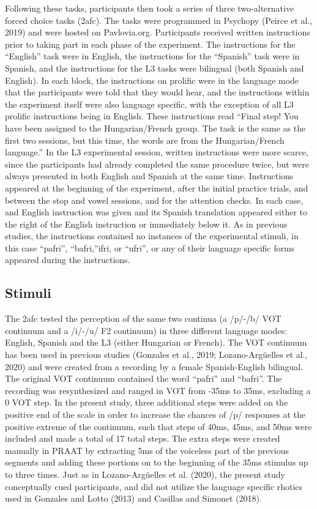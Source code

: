 \documentclass[
  man,floatsintext]{apa6}
\begin{document}
Following these tasks, participants then took a series of three two-alternative forced choice tasks (2afc).
The tasks were programmed in Psychopy (Peirce et al., 2019) and were hosted on Pavlovia.org.
Participants received written instructions prior to taking part in each phase of the experiment. The instructions for the ``English'' task were in English, the instructions for the ``Spanish'' task were in Spanish, and the instructions for the L3 tasks were bilingual (both Spanish and English). In each block, the instructions on prolific were in the language mode that the participants were told that they would hear, and the instructions within the experiment itself were also language specific, with the exception of all L3 prolific instructions being in English. These instructions read ``Final step! You have been assigned to the Hungarian/French group.
The task is the same as the first two sessions, but this time, the words are from the Hungarian/French language.'' In the L3 experimental session, written instructions were more scarce, since the participants had already completed the same procedure twice, but were always presented in both English and Spanish at the same time. Instructions appeared at the beginning of the experiment, after the initial practice trials, and between the stop and vowel sessions, and for the attention checks. In each case, and English instruction was given and its Spanish translation appeared either to the right of the English instruction or immediately below it.
As in previous studies, the instructions contained no instances of the experimental stimuli, in this case ``pafri'', ``bafri,''ifri, or ``ufri'', or any of their language specific forms appeared during the instructions.

\hypertarget{stimuli}{%
\subsection{Stimuli}\label{stimuli}}

The 2afc tested the perception of the same two continua (a /p/-/b/ VOT continuum and a /i/-/u/ F2 continuum) in three different language modes: English, Spanish and the L3 (either Hungarian or French). The VOT continuum has been used in previous studies (Gonzales et al., 2019; Lozano-Argüelles et al., 2020) and were created from a recording by a female Spanish-English bilingual. The original VOT continuum contained the word ``pafri'' and ``bafri''. The recording was resynthesized and ranged in VOT from -35ms to 35ms, excluding a 0 VOT step. In the present study, three additional steps were added on the positive end of the scale in order to increase the chances of /p/ responses at the positive extreme of the continuum, such that steps of 40ms, 45ms, and 50ms were included and made a total of 17 total steps. The extra steps were created manually in PRAAT by extracting 5ms of the voiceless part of the previous segments and adding these portions on to the beginning of the 35ms stimulus up to three times.
Just as in Lozano-Argüelles et al. (2020), the present study conceptually cued participants, and did not utilize the language specific rhotics used in Gonzales and Lotto (2013) and Casillas and Simonet (2018).
\end{document}
